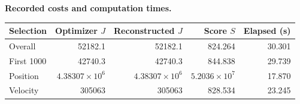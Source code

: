 \par\noindent\textbf{Recorded costs and computation times.}
\begin{center}
\begin{tabular}{lrrrr}
\toprule
Selection & Optimizer $J$ & Reconstructed $J$ & Score $S$ & Elapsed (s)\\
\midrule
Overall & 52182.1 & 52182.1 & 824.264 & 30.301\\
First 1000 & 42740.3 & 42740.3 & 844.838 & 29.739\\
Position & $4.38307\times10^{6}$ & $4.38307\times10^{6}$ & $5.2036\times10^{7}$ & 17.870\\
Velocity & 305063 & 305063 & 828.534 & 23.245\\
\bottomrule
\end{tabular}
\end{center}
\clearpage
